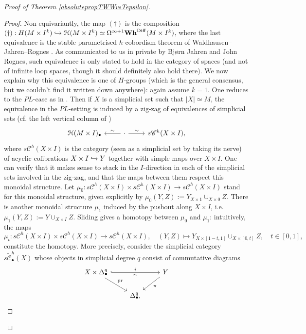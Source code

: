 \documentclass[a4paper, oneside]{amsart}
\newcommand{\diff}{\mathrm{Diff}}
\newcommand{\1}{\mathds{1}}
\theoremstyle{remark}
\theoremstyle{definition}
\newcommand{\Whsp}{\mathbf{Wh}^{\diff}}
\numberwithin{equation}{section}
\begin{document}
\begin{proof}[Proof of Theorem \ref{absolutepropTWWvsTepsilon}]
\begin{proof}
 Non equivariantly, the map $(\dagger)$ is the composition $(\dagger): H(M\times I^k)\xhookrightarrow{}\mathcal H(M\times I^k)\simeq \Omega^{\infty+1}\Whsp(M\times I^k)$, where the last equivalence is the stable parametrised $h$-cobordism theorem of Waldhausen--Jahren--Rognes \cite[Thm. 0.1]{RognesWald}. As communicated to us in private by Bjørn Jahren and John Rognes, such equivalence is only stated to hold in the category of spaces (and not of infinite loop spaces, though it should definitely also hold there). We now explain why this equivalence is one of $H$-groups (which is the general consensus, but we couldn't find it written down anywhere): again assume $k=1$. One reduces to the $PL$-case as in \cite[pp. 15 \& 16]{RognesWald}. Then if $X$ is a simplicial set such that $|X|\simeq M$, the equivalence in the $PL$-setting is induced by a zig-zag of equivalences of simplicial sets (cf. the left vertical column of \cite[Eq. (0.4)]{RognesWald})
 $$
 \begin{tikzcd}
\mathcal{H}(M\times I)_\bullet &\lar["\sim"']\cdot\rar["\sim"] & s\mathscr{C}^h(X\times I),
\end{tikzcd}
 $$
 where $s\mathscr{C}^h(X\times I)$ is the category (seen as a simplicial set by taking its nerve) of acyclic cofibrations $X\times I\xhookrightarrow{}Y$ together with simple maps over $X\times I$. One can verify that it makes sense to stack in the $I$-direction in each of the simplicial sets involved in the zig-zag, and that the maps between them respect this monoidal structure. Let $\mu_0: s\mathscr{C}^h(X\times I)\times s\mathscr{C}^h(X\times I)\to s\mathscr{C}^h(X\times I)$ stand for this monoidal structure, given explicitly by
 $\mu_0(Y,Z):=Y {}_{X\times {1}}\cup_{X\times 0}Z$. There is another monoidal structure $\mu_1$ induced by the pushout along $X\times I$, i.e. $\mu_1(Y,Z):=Y\cup_{X\times I} Z$. Sliding gives a homotopy between $\mu_0$ and $\mu_1$: intuitively, the maps
 $$
\mu_t: s\mathscr{C}^h(X\times I)\times s\mathscr{C}^h(X\times I)\longrightarrow s\mathscr{C}^h(X\times I), \quad (Y,Z)\longmapsto Y{}_{X\times [1-t,1]}\cup_{X\times [0,t]} Z, \quad t\in [0,1],
 $$
constitute the homotopy. More precisely, consider the simplicial category $s\widetilde{\mathscr{C}}^h_\bullet(X)$ \cite[Defn. 3.1.1]{RognesWald} whose objects in simplicial degree $q$ consist of commutative diagrams
$$
\begin{tikzcd}
    X\times \Delta^q_\bullet\ar[dr, "\mathrm{pr}"]\ar[rr,hook, "i", "\sim"'] &&Y\ar[dl, "\pi"]\\
    &\Delta^q_\bullet,&
\end{tikzcd}
$$
\end{proof}
\end{proof}
\end{document}
